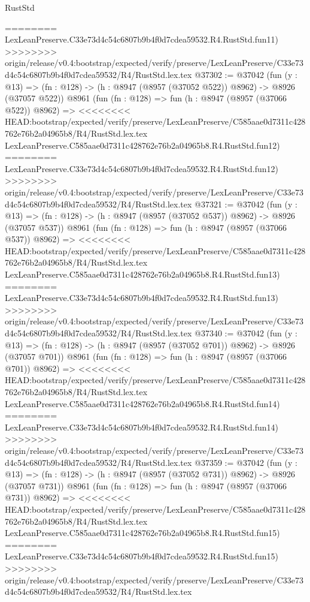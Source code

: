 \begin{lexlean}{RustStd}
\begin{coremodule}
{\begin{coremodule}
{{{{{{{{{{{{{{{{{{{{{{{{{{{{{{{{{{{{{{{========
    LexLeanPreserve.C33e73d4c54c6807b9b4f0d7cdea59532.R4.RustStd.fun11)
>>>>>>>> origin/release/v0.4:bootstrap/expected/verify/preserve/LexLeanPreserve/C33e73d4c54c6807b9b4f0d7cdea59532/R4/RustStd.lex.tex
@37302 := @37042
    (fun (y : @13) => (fn : @128) -> (h : @8947 (@8957 (@37052 @522)) @8962) -> @8926 (@37057 @522))
    @8961
    (fun (fn : @128) =>
    fun (h : @8947 (@8957 (@37066 @522)) @8962) =>
<<<<<<<< HEAD:bootstrap/expected/verify/preserve/LexLeanPreserve/C585aae0d7311c428762e76b2a04965b8/R4/RustStd.lex.tex
    LexLeanPreserve.C585aae0d7311c428762e76b2a04965b8.R4.RustStd.fun12)
========
    LexLeanPreserve.C33e73d4c54c6807b9b4f0d7cdea59532.R4.RustStd.fun12)
>>>>>>>> origin/release/v0.4:bootstrap/expected/verify/preserve/LexLeanPreserve/C33e73d4c54c6807b9b4f0d7cdea59532/R4/RustStd.lex.tex
@37321 := @37042
    (fun (y : @13) => (fn : @128) -> (h : @8947 (@8957 (@37052 @537)) @8962) -> @8926 (@37057 @537))
    @8961
    (fun (fn : @128) =>
    fun (h : @8947 (@8957 (@37066 @537)) @8962) =>
<<<<<<<< HEAD:bootstrap/expected/verify/preserve/LexLeanPreserve/C585aae0d7311c428762e76b2a04965b8/R4/RustStd.lex.tex
    LexLeanPreserve.C585aae0d7311c428762e76b2a04965b8.R4.RustStd.fun13)
========
    LexLeanPreserve.C33e73d4c54c6807b9b4f0d7cdea59532.R4.RustStd.fun13)
>>>>>>>> origin/release/v0.4:bootstrap/expected/verify/preserve/LexLeanPreserve/C33e73d4c54c6807b9b4f0d7cdea59532/R4/RustStd.lex.tex
@37340 := @37042
    (fun (y : @13) => (fn : @128) -> (h : @8947 (@8957 (@37052 @701)) @8962) -> @8926 (@37057 @701))
    @8961
    (fun (fn : @128) =>
    fun (h : @8947 (@8957 (@37066 @701)) @8962) =>
<<<<<<<< HEAD:bootstrap/expected/verify/preserve/LexLeanPreserve/C585aae0d7311c428762e76b2a04965b8/R4/RustStd.lex.tex
    LexLeanPreserve.C585aae0d7311c428762e76b2a04965b8.R4.RustStd.fun14)
========
    LexLeanPreserve.C33e73d4c54c6807b9b4f0d7cdea59532.R4.RustStd.fun14)
>>>>>>>> origin/release/v0.4:bootstrap/expected/verify/preserve/LexLeanPreserve/C33e73d4c54c6807b9b4f0d7cdea59532/R4/RustStd.lex.tex
@37359 := @37042
    (fun (y : @13) => (fn : @128) -> (h : @8947 (@8957 (@37052 @731)) @8962) -> @8926 (@37057 @731))
    @8961
    (fun (fn : @128) =>
    fun (h : @8947 (@8957 (@37066 @731)) @8962) =>
<<<<<<<< HEAD:bootstrap/expected/verify/preserve/LexLeanPreserve/C585aae0d7311c428762e76b2a04965b8/R4/RustStd.lex.tex
    LexLeanPreserve.C585aae0d7311c428762e76b2a04965b8.R4.RustStd.fun15)
========
    LexLeanPreserve.C33e73d4c54c6807b9b4f0d7cdea59532.R4.RustStd.fun15)
>>>>>>>> origin/release/v0.4:bootstrap/expected/verify/preserve/LexLeanPreserve/C33e73d4c54c6807b9b4f0d7cdea59532/R4/RustStd.lex.tex
}}}}}}}}}}}}}}}}}}}}}}}}}}}}}}}}}}}}}}}
\end{coremodule}}
\end{coremodule}
\end{lexlean}
